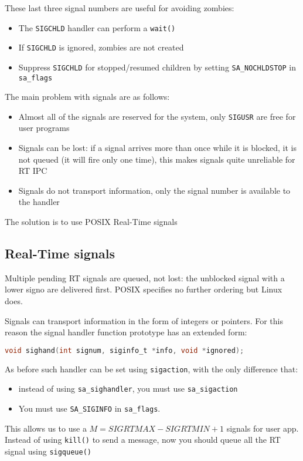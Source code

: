 These last three signal numbers are useful for avoiding zombies:
\begin{itemize}
    \item The \texttt{SIGCHLD} handler can perform a \texttt{wait()}
    \item If \texttt{SIGCHLD} is ignored, zombies are not created
    \item Suppress \texttt{SIGCHLD} for stopped/resumed children by setting \texttt{SA\_NOCHLDSTOP} in \texttt{sa\_flags}
\end{itemize}

The main problem with signals are as follows:
\begin{itemize}
    \item Almost all of the signals are reserved for the system, only \texttt{SIGUSR} are free for user programs
    \item Signals can be lost: if a signal arrives more than once while it is blocked, it is not queued (it will fire only one time), this makes signals quite unreliable for RT IPC
    \item Signals do not transport information, only the signal number is available to the handler
\end{itemize}
The solution is to use POSIX Real-Time signals

\subsection{Real-Time signals}
Multiple pending RT signals are queued, not lost: the unblocked signal with a lower signo are delivered first. POSIX specifies no further ordering but Linux does.

Signals can transport information in the form of integers or pointers. For this reason the signal handler function prototype has an extended form:
\begin{lstlisting}[language=C]
    void sighand(int signum, siginfo_t *info, void *ignored);
\end{lstlisting}

As before such handler can be set using \texttt{sigaction}, with the only difference that:
\begin{itemize}
    \item instead of using \texttt{sa\_sighandler}, you must use \texttt{sa\_sigaction}
    \item You must use \texttt{SA\_SIGINFO} in \texttt{sa\_flags}.
\end{itemize}
This allows us to use a $M = SIGRTMAX - SIGRTMIN + 1$ signals for user app.
Instead of using \texttt{kill()} to send a message, now you should queue all the RT signal using \texttt{sigqueue()}

